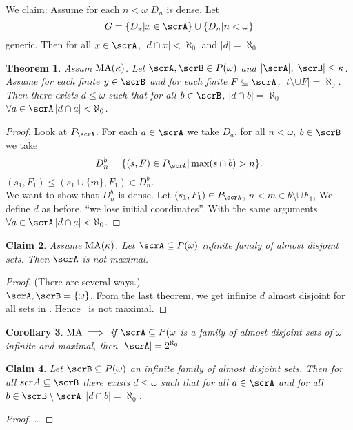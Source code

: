 \documentclass[11pt,pdftex,twoside,a4paper]{article}
\newcommand{\MA}{\ensuremath{\mathop{\rm MA}\nolimits}}
\newtheorem{thm}{Theorem}[section]
\newtheorem{claim}[thm]{Claim}
\newtheorem{corollary}[thm]{Corollary}
\begin{document}
We claim: Assume for each \(n<\omega\) \(D_n\) is dense.
Let
\begin{equation*}
G = \{D_x| x\in\scrA\} \cup \{D_n | n < \omega\}
\end{equation*}
generic.
Then for all \(x\in\scrA\), \(|d\cap x|< \aleph_0\) and \(|d|=\aleph_0\)

\begin{thm}
Assum \(\MA(\kappa)\). Let \(\scrA,\scrB\in P(\omega)\) and 
\(|\scrA|,|\scrB| \leq \kappa\).
Assume for each finite \(y\in\scrB\) and for each finite \(F\subseteq \scrA\),
\(|t\setminus \cup F|=\aleph_0\).
Then there exists \(d\leq \omega\) such that for all \(b\in\scrB\),
\(|d\cap b|=\aleph_0\) 
\(\forall a\in\scrA\, |d\cap a|<\aleph_0\).
\end{thm}
\begin{proof}
Look at \(P_\scrA\). For each \(a\in\scrA\) we take \(D_a\).
for all \(n<\omega\), \(b\in\scrB\) we take
\begin{equation*}
D_n^b = \{(s,F)\in P_\scrA | \max(s\cap b) > n\}.
\end{equation*}
\((s_1,F_1)\leq(s_1\cup\{m\},F_1) \in D_n^b\).
\\
We want to show that \(D_n^b\) is dense.
Let \((s_1,F_1)\in P_\scrA\), \(n < m\in b \setminus \cup F_1\),
We define $d$ as before, ``we lose initial coordinates''.
With the same arguments \(\forall a\in\scrA\, |d\cap a|<\aleph_0\).
\end{proof}

\begin{claim}
Assume \(\MA(\kappa)\). Let \(\scrA \subseteq P(\omega)\)
infinite family of almost disjoint sets. Then \(\scrA\) is not maximal.
\end{claim}
\begin{proof}
(There are several ways.)\\
\(\scrA,\scrB=\{\omega\}\).
From the last theorem, we get infinite $d$ almost disjoint 
for all sets in \scrA. Hence \scrA\ is not maximal.
\end{proof}

\begin{corollary}
\(\MA \implies\) if \(\scrA \subseteq P(\omega\) is a family
of almost disjoint sets of \(\omega\) infinite and maximal, then
\(|\scrA| = 2^{\aleph_0}\).
\end{corollary}

\begin{claim}
Let \(\scrB \subseteq P(\omega)\) an infinite family of 
almost disjoint sets. Then for all \(scrA \subseteq \scrB\)
there exists \(d \leq \omega\) such that for all \(a\in\scrA\)
and for all \(b\in \scrB\setminus\scrA\) \(|d\cap b|=\aleph_0\).
\end{claim}
\begin{proof}
\ldots
\end{proof}
\end{document}
